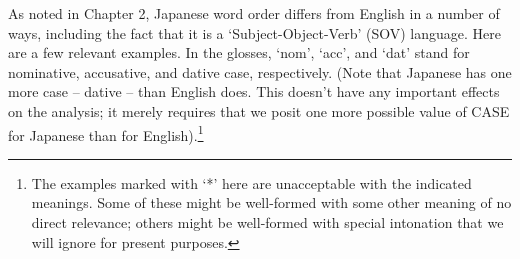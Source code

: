 \documentclass[a4paper,landscape,headrule,footrule]{foils}
\begin{document}





As noted 
in Chapter 2, Japanese word order differs from English in a number of ways,
including the fact that it is a  `Subject-Object-Verb' (SOV) language.  Here
are a few relevant examples. In the glosses, `{\sc nom}', `{\sc acc}', and 
`{\sc dat}' stand for  nominative,
 accusative, and  dative 
case, respectively.  (Note that Japanese has one more case -- dative -- than
English does.  This doesn't have any important effects on the analysis; it
merely requires that we posit one more possible value of CASE for Japanese
than for English).\footnote{The examples
marked with `*' here
are unacceptable with the indicated meanings.  Some of these might be
well-formed with some other meaning of no direct relevance; others might be
well-formed with special  intonation that we will ignore for present
purposes.}
\end{document}

